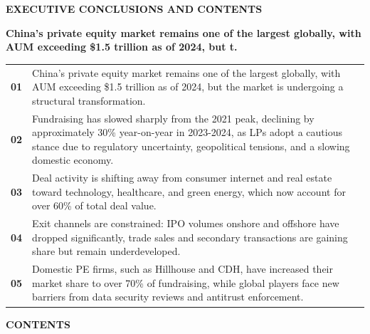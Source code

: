 \documentclass[10pt,a4paper]{article}
\begin{document}
{\textcolor{BOBlue}{\scriptsize\bfseries EXECUTIVE CONCLUSIONS AND CONTENTS}}\par\vspace{-1pt}
{\Large\sffamily\bfseries\color{BONavy} China's private equity market remains one of the largest globally, with AUM exceeding \$1.5 trillion as of 2024, but t.}\par\vspace{4pt}
\vspace{2pt}{\color{BOBright}\rule{\linewidth}{1pt}}\vspace{5pt}
\begin{tabularx}{\linewidth}{p{12mm}Y}
\textcolor{BOBlue}{\bfseries 01} & {\footnotesize China's private equity market remains one of the largest globally, with AUM exceeding \$1.5 trillion as of 2024, but the market is undergoing a structural transformation.} \\[4pt]
\textcolor{BOBlue}{\bfseries 02} & {\footnotesize Fundraising has slowed sharply from the 2021 peak, declining by approximately 30\% year-on-year in 2023-2024, as LPs adopt a cautious stance due to regulatory uncertainty, geopolitical tensions, and a slowing domestic economy.} \\[4pt]
\textcolor{BOBlue}{\bfseries 03} & {\footnotesize Deal activity is shifting away from consumer internet and real estate toward technology, healthcare, and green energy, which now account for over 60\% of total deal value.} \\[4pt]
\textcolor{BOBlue}{\bfseries 04} & {\footnotesize Exit channels are constrained: IPO volumes onshore and offshore have dropped significantly, trade sales and secondary transactions are gaining share but remain underdeveloped.} \\[4pt]
\textcolor{BOBlue}{\bfseries 05} & {\footnotesize Domestic PE firms, such as Hillhouse and CDH, have increased their market share to over 70\% of fundraising, while global players face new barriers from data security reviews and antitrust enforcement.} \\[4pt]
\end{tabularx}
\vspace{6pt}
{\textcolor{BOBlue}{\scriptsize\bfseries CONTENTS}}\par\vspace{2pt}
\end{document}
